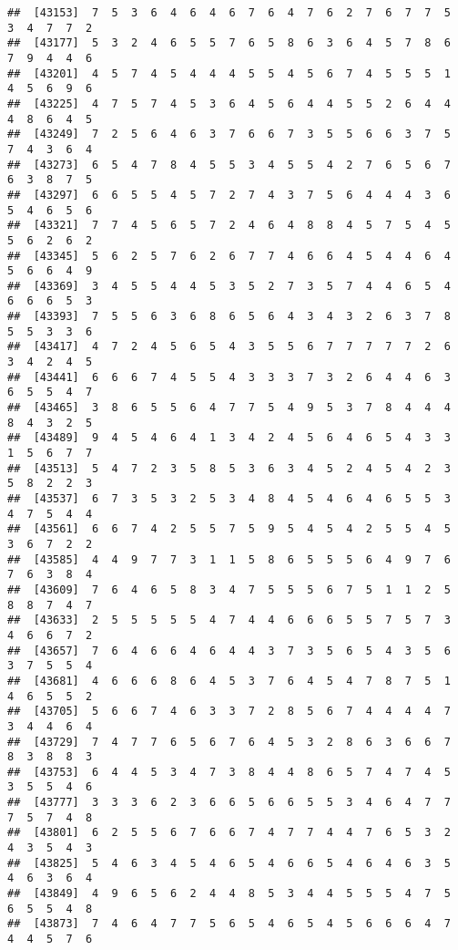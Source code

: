 \documentclass[
]{book}
\begin{document}
\begin{verbatim}
##  [43153]  7  5  3  6  4  6  4  6  7  6  4  7  6  2  7  6  7  7  5  3  4  7  7  2
##  [43177]  5  3  2  4  6  5  5  7  6  5  8  6  3  6  4  5  7  8  6  7  9  4  4  6
##  [43201]  4  5  7  4  5  4  4  4  5  5  4  5  6  7  4  5  5  5  1  4  5  6  9  6
##  [43225]  4  7  5  7  4  5  3  6  4  5  6  4  4  5  5  2  6  4  4  4  8  6  4  5
##  [43249]  7  2  5  6  4  6  3  7  6  6  7  3  5  5  6  6  3  7  5  7  4  3  6  4
##  [43273]  6  5  4  7  8  4  5  5  3  4  5  5  4  2  7  6  5  6  7  6  3  8  7  5
##  [43297]  6  6  5  5  4  5  7  2  7  4  3  7  5  6  4  4  4  3  6  5  4  6  5  6
##  [43321]  7  7  4  5  6  5  7  2  4  6  4  8  8  4  5  7  5  4  5  5  6  2  6  2
##  [43345]  5  6  2  5  7  6  2  6  7  7  4  6  6  4  5  4  4  6  4  5  6  6  4  9
##  [43369]  3  4  5  5  4  4  5  3  5  2  7  3  5  7  4  4  6  5  4  6  6  6  5  3
##  [43393]  7  5  5  6  3  6  8  6  5  6  4  3  4  3  2  6  3  7  8  5  5  3  3  6
##  [43417]  4  7  2  4  5  6  5  4  3  5  5  6  7  7  7  7  7  2  6  3  4  2  4  5
##  [43441]  6  6  6  7  4  5  5  4  3  3  3  7  3  2  6  4  4  6  3  6  5  5  4  7
##  [43465]  3  8  6  5  5  6  4  7  7  5  4  9  5  3  7  8  4  4  4  8  4  3  2  5
##  [43489]  9  4  5  4  6  4  1  3  4  2  4  5  6  4  6  5  4  3  3  1  5  6  7  7
##  [43513]  5  4  7  2  3  5  8  5  3  6  3  4  5  2  4  5  4  2  3  5  8  2  2  3
##  [43537]  6  7  3  5  3  2  5  3  4  8  4  5  4  6  4  6  5  5  3  4  7  5  4  4
##  [43561]  6  6  7  4  2  5  5  7  5  9  5  4  5  4  2  5  5  4  5  3  6  7  2  2
##  [43585]  4  4  9  7  7  3  1  1  5  8  6  5  5  5  6  4  9  7  6  7  6  3  8  4
##  [43609]  7  6  4  6  5  8  3  4  7  5  5  5  6  7  5  1  1  2  5  8  8  7  4  7
##  [43633]  2  5  5  5  5  5  4  7  4  4  6  6  6  5  5  7  5  7  3  4  6  6  7  2
##  [43657]  7  6  4  6  6  4  6  4  4  3  7  3  5  6  5  4  3  5  6  3  7  5  5  4
##  [43681]  4  6  6  6  8  6  4  5  3  7  6  4  5  4  7  8  7  5  1  4  6  5  5  2
##  [43705]  5  6  6  7  4  6  3  3  7  2  8  5  6  7  4  4  4  4  7  3  4  4  6  4
##  [43729]  7  4  7  7  6  5  6  7  6  4  5  3  2  8  6  3  6  6  7  8  3  8  8  3
##  [43753]  6  4  4  5  3  4  7  3  8  4  4  8  6  5  7  4  7  4  5  3  5  5  4  6
##  [43777]  3  3  3  6  2  3  6  6  5  6  6  5  5  3  4  6  4  7  7  7  5  7  4  8
##  [43801]  6  2  5  5  6  7  6  6  7  4  7  7  4  4  7  6  5  3  2  4  3  5  4  3
##  [43825]  5  4  6  3  4  5  4  6  5  4  6  6  5  4  6  4  6  3  5  4  6  3  6  4
##  [43849]  4  9  6  5  6  2  4  4  8  5  3  4  4  5  5  5  4  7  5  6  5  5  4  8
##  [43873]  7  4  6  4  7  7  5  6  5  4  6  5  4  5  6  6  6  4  7  4  4  5  7  6

\end{verbatim}
\end{document}
